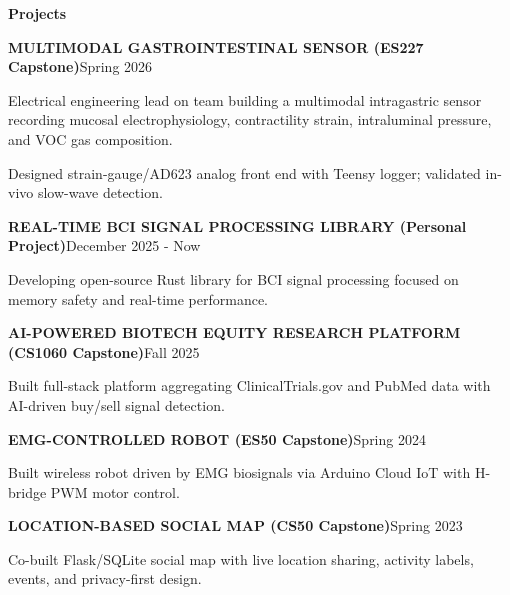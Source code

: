 \documentclass{article}
\newcommand{\eleven}{\fontsize{11bp}{12.66bp}\selectfont}
\newcommand{\twelve}{\fontsize{12bp}{13.76bp}\selectfont}
\renewcommand{\section}[1]{\par{\twelve\centering\textbf{#1}\par}}
\newcommand{\entry}[3][0bp]{\par{\eleven\textbf{#2}\hfill#3\hspace*{#1}\par}}
\begin{document}
\section{Projects}
\entry{MULTIMODAL GASTROINTESTINAL SENSOR (ES227 Capstone)}{Spring 2026}
\begin{bullets}
\item {\eleven Electrical engineering lead on team building a multimodal intragastric sensor recording mucosal electrophysiology, contractility strain, intraluminal pressure, and VOC gas composition.\par}
\item {\eleven Designed strain-gauge/AD623 analog front end with Teensy logger; validated in-vivo slow-wave detection.\par}
\end{bullets}
\entry[0.54bp]{REAL-TIME BCI SIGNAL PROCESSING LIBRARY (Personal Project)}{December 2025 - Now}
\begin{bullets}
\item {\eleven Developing open-source Rust library for BCI signal processing focused on memory safety and real-time performance.\par}
\end{bullets}
\entry{AI-POWERED BIOTECH EQUITY RESEARCH PLATFORM (CS1060 Capstone)}{Fall 2025}
\begin{bullets}
\item {\eleven Built full-stack platform aggregating ClinicalTrials.gov and PubMed data with AI-driven buy/sell signal detection.\par}
\end{bullets}
\entry{EMG-CONTROLLED ROBOT (ES50 Capstone)}{Spring 2024}
\begin{bullets}
\item {\eleven Built wireless robot driven by EMG biosignals via Arduino Cloud IoT with H-bridge PWM motor control.\par}
\end{bullets}
\entry{LOCATION-BASED SOCIAL MAP (CS50 Capstone)}{Spring 2023}
\begin{bullets}
\item {\eleven Co-built Flask/SQLite social map with live location sharing, activity labels, events, and privacy-first design.\par}
\end{bullets}
\end{document}
